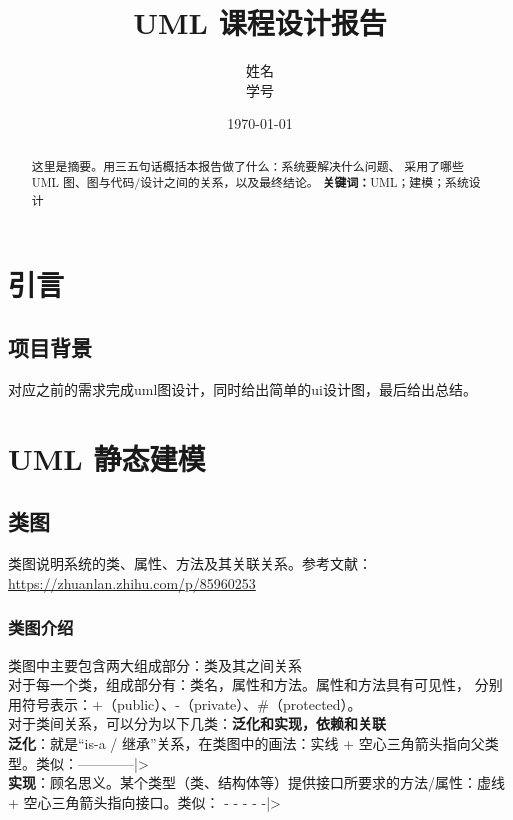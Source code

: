 \documentclass[12pt, a4paper]{ctexart}
\title{UML 课程设计报告}
\author{姓名 \\ 学号}
\date{\today}
\begin{document}
\maketitle
\thispagestyle{empty}

\begin{abstract}
这里是摘要。用三五句话概括本报告做了什么：系统要解决什么问题、
采用了哪些 UML 图、图与代码/设计之间的关系，以及最终结论。
\noindent\textbf{关键词：}UML；建模；系统设计
\end{abstract}

\newpage
\tableofcontents
\newpage

\section{引言}

\subsection{项目背景}
对应之前的需求完成uml图设计，同时给出简单的ui设计图，最后给出总结。

\section{UML 静态建模}

\subsection{类图}
类图说明系统的类、属性、方法及其关联关系。参考文献：\url{https://zhuanlan.zhihu.com/p/85960253}

\subsubsection{类图介绍}
类图中主要包含两大组成部分：类及其之间关系 \\

对于每一个类，组成部分有：类名，属性和方法。属性和方法具有可见性，
分别用符号表示：+（public）、-（private）、\#（protected）。\\

对于类间关系，可以分为以下几类：\textbf{泛化和实现，依赖和关联}\\

\textbf{泛化}：就是“is-a / 继承”关系，在类图中的画法：实线 + 空心三角箭头指向父类型。类似：————|>\\

\textbf{实现}：顾名思义。某个类型（类、结构体等）提供接口所要求的方法/属性：虚线 + 空心三角箭头指向接口。类似： - - - - -|>\\
\end{document}
